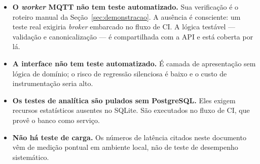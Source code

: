 \begin{limitacao}
\begin{itemize}
  \item \textbf{O \textit{worker} MQTT não tem teste automatizado.} Sua
    verificação é o roteiro manual da Seção~\ref{sec:demonstracao}. A ausência é
    consciente: um teste real exigiria \textit{broker} embarcado no fluxo de CI.
    A lógica testável --- validação e canonicalização --- é compartilhada com a
    API e está coberta por lá.
  \item \textbf{A interface não tem teste automatizado.} É camada de
    apresentação sem lógica de domínio; o risco de regressão silenciosa é baixo
    e o custo de instrumentação seria alto.
  \item \textbf{Os testes de analítica são pulados sem PostgreSQL.} Eles exigem
    recursos estatísticos ausentes no SQLite. São executados no fluxo de CI, que
    provê o banco como serviço.
  \item \textbf{Não há teste de carga.} Os números de latência citados neste
    documento vêm de medição pontual em ambiente local, não de teste de
    desempenho sistemático.
\end{itemize}
\end{limitacao}
